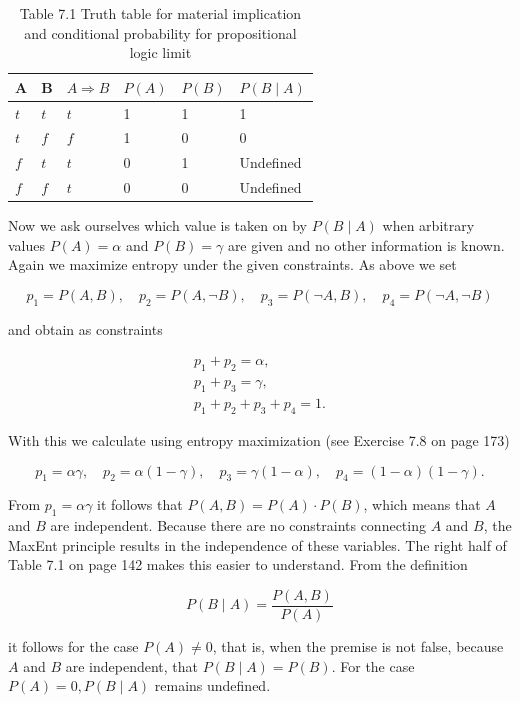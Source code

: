 \documentclass[10pt]{article}
\begin{document}
\begin{table}[h]
\begin{center}
\captionsetup{labelformat=empty}
\caption{Table 7.1 Truth table for material implication and conditional probability for propositional logic limit}
\begin{tabular}{|l|l|l|l|l|l|}
\hline
A & B & $A \Rightarrow B$ & $P(A)$ & $P(B)$ & $P(B \mid A)$ \\
\hline
$t$ & $t$ & $t$ & 1 & 1 & 1 \\
\hline
$t$ & $f$ & $f$ & 1 & 0 & 0 \\
\hline
$f$ & $t$ & $t$ & 0 & 1 & Undefined \\
\hline
$f$ & $f$ & $t$ & 0 & 0 & Undefined \\
\hline
\end{tabular}
\end{center}
\end{table}

Now we ask ourselves which value is taken on by $P(B \mid A)$ when arbitrary values $P(A)=\alpha$ and $P(B)=\gamma$ are given and no other information is known. Again we maximize entropy under the given constraints. As above we set

$$
p_{1}=P(A, B), \quad p_{2}=P(A, \neg B), \quad p_{3}=P(\neg A, B), \quad p_{4}=P(\neg A, \neg B)
$$

and obtain as constraints


\begin{gather*}
p_{1}+p_{2}=\alpha,  \tag{7.10}\\
p_{1}+p_{3}=\gamma,  \tag{7.11}\\
p_{1}+p_{2}+p_{3}+p_{4}=1 . \tag{7.12}
\end{gather*}


With this we calculate using entropy maximization (see Exercise 7.8 on page 173)

$$
p_{1}=\alpha \gamma, \quad p_{2}=\alpha(1-\gamma), \quad p_{3}=\gamma(1-\alpha), \quad p_{4}=(1-\alpha)(1-\gamma) .
$$

From $p_{1}=\alpha \gamma$ it follows that $P(A, B)=P(A) \cdot P(B)$, which means that $A$ and $B$ are independent. Because there are no constraints connecting $A$ and $B$, the MaxEnt principle results in the independence of these variables. The right half of Table 7.1 on page 142 makes this easier to understand. From the definition

$$
P(B \mid A)=\frac{P(A, B)}{P(A)}
$$

it follows for the case $P(A) \neq 0$, that is, when the premise is not false, because $A$ and $B$ are independent, that $P(B \mid A)=P(B)$. For the case $P(A)=0, P(B \mid A)$ remains undefined.
\end{document}
